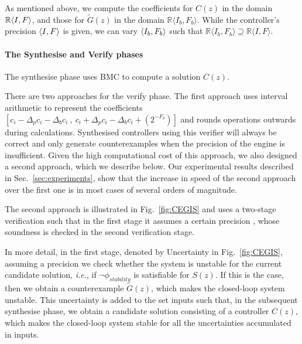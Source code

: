\documentclass{sig-alternate-05-2015}
\newcommand{\red}[1]{{\color{red}#1}}
\begin{document}
As mentioned above, we compute the coefficients for $C(z)$ 
in the domain $\mathbb{R}\langle{I},{F}\rangle$, 
and those for $\tilde G(z)$ in the domain
$\mathbb{R}\langle I_b,F_b \rangle$.
While the controller's precision $\langle{I},{F}\rangle$ is given, 
we can vary $\langle{I_b},{F_b}\rangle$ such that 
$\mathbb{R}\langle I_b,F_b \rangle \supseteq \mathbb{R}\langle I,F \rangle$.

\paragraph{The {\sc Synthesise} and {\sc Verify} phases}
The {\sc synthesise} phase uses BMC to 
compute a solution $C(z)$. %

There are two approaches for the {\sc verify} phase.
The first approach uses interval arithmetic \cite{moore1966interval}
to represent the coefficients
$[{c}_i-\Delta_p{c}_i-\Delta_b{c}_i\ ,\
{c}_i+\Delta_p{c}_i-\Delta_b{c}_i+(2^{-F_b})]$ 
and rounds operations outwards during calculations. 
Synthesised controllers using this verifier will always
be correct and only generate counterexamples when the precision of the
engine is insufficient. Given the high computational cost of this
approach, we also designed a second approach, which we describe below.
Our experimental results described in Sec.~\ref{sec:experiments},  
show that the increase in speed of the second approach 
over the first one is in most cases of several orders of magnitude.

The second approach is illustrated in Fig.~\ref{fig:CEGIS} and 
uses a two-stage verification such that in the first stage it 
assumes a certain precision , whose 
soundness is checked in the second verification stage.

In more detail, in the first stage, denoted by {\sc Uncertainty} in Fig.~\ref{fig:CEGIS}, 
assuming a precision \param{I_b}{F_b} 
we check whether the system is unstable for the current candidate solution,
{\it i.e.}, if $\neg \phi_{stability}$ is satisfiable for $S(z)$.
If this is the case, then we obtain a counterexample 
$\tilde G(z)$, 
which makes the closed-loop system unstable. 
This uncertainty is added to 
the set {\sc inputs} such that, in the subsequent {\sc synthesise} phase, 
we obtain a candidate solution consisting 
of a controller $C(z)$, which makes the closed-loop 
system stable for all the uncertainties accumulated in {\sc inputs}.
\end{document}
